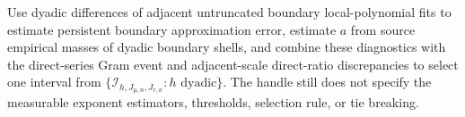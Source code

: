 Use dyadic differences of adjacent untruncated boundary local-polynomial fits to estimate persistent boundary approximation error, estimate \(a\) from source empirical masses of dyadic boundary shells, and combine these diagnostics with the direct-series Gram event and adjacent-scale direct-ratio discrepancies to select one interval from \(\{\mathcal I_{h,J_{\mu,n},J_{r,n}}:h\text{ dyadic}\}\). The handle still does not specify the measurable exponent estimators, thresholds, selection rule, or tie breaking.